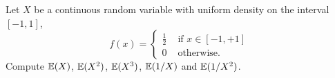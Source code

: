 \begin{exercise}
\begin{questions}
\begin{answer}
\end{answer}

\question
Let $X$ be a continuous random variable with uniform density on the interval $[-1,1]$,
\[
f(x) = \begin{cases}
	\frac{1}{2}	& \text{ if } x\in[-1,+1] \\
	0			& \text{ otherwise.}
\end{cases}
\]
Compute $\mathbb{E}(X)$, $\mathbb{E}(X^2)$, $\mathbb{E}(X^3)$, $\mathbb{E}(1/X)$ and $\mathbb{E}(1/X^2)$.


\end{questions}
\end{exercise}
